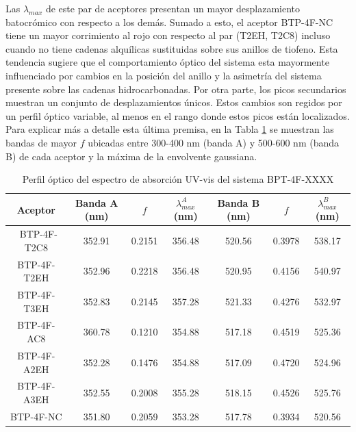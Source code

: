 Las $\lambda_{max}$ de este par de aceptores presentan un mayor desplazamiento batocrómico con respecto a los demás. Sumado a esto, el aceptor BTP-4F-NC tiene un mayor corrimiento al rojo con respecto al par (T2EH, T2C8) incluso cuando no tiene cadenas alquílicas sustituidas sobre sus anillos de tiofeno. Esta tendencia sugiere que el comportamiento óptico del sistema esta mayormente influenciado por cambios en la posición del anillo y la asimetría del sistema presente sobre las cadenas hidrocarbonadas. Por otra parte, los picos secundarios muestran un conjunto de desplazamientos únicos. Estos cambios son regidos por un perfil óptico variable, al menos en el rango donde estos picos están localizados. Para explicar más a detalle esta última premisa, en la Tabla \ref{table:R25B-2} se muestran las bandas de mayor $f$ ubicadas entre 300-400 nm (banda A) y 500-600 nm (banda B) de cada aceptor y la máxima de la envolvente gaussiana. 
\begin{table}[h] %
\caption{Perfil óptico del espectro de absorción UV-vis del sistema BPT-4F-XXXX }
\label{table:R25B-2} \vspace{-0.5cm}
\begin{center} 
\begin{tabular}{ccccccc}
\hline 
Aceptor & Banda A (nm) & $f$ & $\lambda_{max}^A $ (nm) & Banda B (nm) & $f$ & $\lambda_{max}^B $ (nm)  \\ \hline \
BTP-4F-T2C8 & 352.91 &  0.2151 & 356.48 & 520.56 & 0.3978 & 538.17  \\
BTP-4F-T2EH &  352.96 & 0.2218 & 356.48 & 520.95 &  0.4156 & 540.97 \\
BTP-4F-T3EH & 352.83 & 0.2145 & 357.28 & 521.33 & 0.4276 & 532.97 \\
BTP-4F-AC8 & 360.78 & 0.1210 & 354.88 & 517.18 & 0.4519 & 525.36  \\
BTP-4F-A2EH & 352.28 & 0.1476 & 354.88 &517.09 &  0.4720 & 524.96\\
BTP-4F-A3EH & 352.55 & 0.2008 & 355.28 & 518.15 &  0.4526 & 525.76\\
BTP-4F-NC & 351.80 &  0.2059 &353.28 & 517.78 & 0.3934 & 520.56 \\ \hline
\end{tabular}
\end{center}
\vspace{-0.2cm}
\end{table} \\
